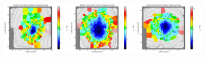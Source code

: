 \begin{figure}
      \\
      \includegraphics[width=0.3\textwidth]{chapter4/Vmaps/ngc3100_stellar_sigma_uncert.png}
      \includegraphics[width=0.3\textwidth]{chapter4/Vmaps/ngc3557_stellar_sigma_uncert.png}
      \includegraphics[width=0.3\textwidth]{chapter4/Vmaps/ngc7075_stellar_sigma_uncert.png}
      \\
\end{figure}

